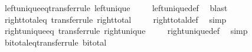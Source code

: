 \begin{isabellebody}
\ left{\isacharunderscore}{\kern0pt}unique{\isacharunderscore}{\kern0pt}eq{\isacharbrackleft}{\kern0pt}transfer{\isacharunderscore}{\kern0pt}rule{\isacharbrackright}{\kern0pt}{\isacharcolon}{\kern0pt}\ {\isachardoublequoteopen}left{\isacharunderscore}{\kern0pt}unique\ {\isacharparenleft}{\kern0pt}{\isacharequal}{\kern0pt}{\isacharparenright}{\kern0pt}{\isachardoublequoteclose}\isanewline
%
\isadelimproof
\ \ %
\endisadelimproof
%
\isatagproof
{}\isamarkupfalse%
\ left{\isacharunderscore}{\kern0pt}unique{\isacharunderscore}{\kern0pt}def\ \isamarkupfalse%
\ blast%
\endisatagproof
{\isafoldproof}%
%
\isadelimproof
\isanewline
%
\endisadelimproof
\isanewline
{}\isamarkupfalse%
\ right{\isacharunderscore}{\kern0pt}total{\isacharunderscore}{\kern0pt}eq\ {\isacharbrackleft}{\kern0pt}transfer{\isacharunderscore}{\kern0pt}rule{\isacharbrackright}{\kern0pt}{\isacharcolon}{\kern0pt}\ {\isachardoublequoteopen}right{\isacharunderscore}{\kern0pt}total\ {\isacharparenleft}{\kern0pt}{\isacharequal}{\kern0pt}{\isacharparenright}{\kern0pt}{\isachardoublequoteclose}\isanewline
%
\isadelimproof
\ \ %
\endisadelimproof
%
\isatagproof
{}\isamarkupfalse%
\ right{\isacharunderscore}{\kern0pt}total{\isacharunderscore}{\kern0pt}def\ \isamarkupfalse%
\ simp%
\endisatagproof
{\isafoldproof}%
%
\isadelimproof
\isanewline
%
\endisadelimproof
\isanewline
{}\isamarkupfalse%
\ right{\isacharunderscore}{\kern0pt}unique{\isacharunderscore}{\kern0pt}eq\ {\isacharbrackleft}{\kern0pt}transfer{\isacharunderscore}{\kern0pt}rule{\isacharbrackright}{\kern0pt}{\isacharcolon}{\kern0pt}\ {\isachardoublequoteopen}right{\isacharunderscore}{\kern0pt}unique\ {\isacharparenleft}{\kern0pt}{\isacharequal}{\kern0pt}{\isacharparenright}{\kern0pt}{\isachardoublequoteclose}\isanewline
%
\isadelimproof
\ \ %
\endisadelimproof
%
\isatagproof
{}\isamarkupfalse%
\ right{\isacharunderscore}{\kern0pt}unique{\isacharunderscore}{\kern0pt}def\ \isamarkupfalse%
\ simp%
\endisatagproof
{\isafoldproof}%
%
\isadelimproof
\isanewline
%
\endisadelimproof
\isanewline
{}\isamarkupfalse%
\ bi{\isacharunderscore}{\kern0pt}total{\isacharunderscore}{\kern0pt}eq{\isacharbrackleft}{\kern0pt}transfer{\isacharunderscore}{\kern0pt}rule{\isacharbrackright}{\kern0pt}{\isacharcolon}{\kern0pt}\ {\isachardoublequoteopen}bi{\isacharunderscore}{\kern0pt}total\ {\isacharparenleft}{\kern0pt}{\isacharequal}{\kern0pt}{\isacharparenright}{\kern0pt}{\isachardoublequoteclose}\isanewline
%
\isadelimproof

\end{isabellebody}
